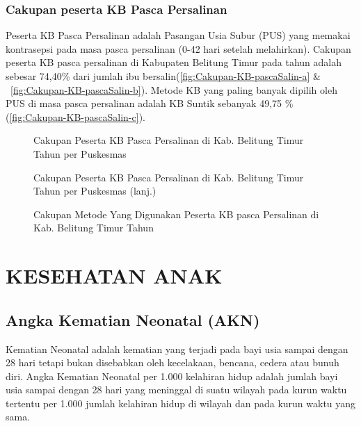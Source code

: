 \subsubsection{Cakupan peserta KB Pasca Persalinan}
Peserta KB Pasca Persalinan adalah Pasangan Usia Subur (PUS) yang memakai kontrasepsi pada masa pasca persalinan (0-42 hari setelah melahirkan). Cakupan peserta KB pasca persalinan di Kabupaten Belitung Timur pada tahun \tP adalah sebesar 74,40\% dari jumlah ibu bersalin(\autoref{fig:Cakupan-KB-pascaSalin-a} \& ~\autoref{fig:Cakupan-KB-pascaSalin-b}). Metode KB yang paling banyak dipilih oleh PUS di masa pasca persalinan adalah KB Suntik sebanyak 49,75 \% (\autoref{fig:Cakupan-KB-pascaSalin-c}).

\begin{figure}[H]
    \centering
    \caption{Cakupan Peserta KB Pasca Persalinan di Kab. Belitung Timur Tahun \tP per Puskesmas}
    \label{fig:Cakupan-KB-pascaSalin-a}
\end{figure}

\begin{figure}[H]
    \centering
    \caption{Cakupan Peserta KB Pasca Persalinan di Kab. Belitung Timur Tahun \tP per Puskesmas (lanj.)}
    \label{fig:Cakupan-KB-pascaSalin-b}
\end{figure}

\begin{figure}[H]
    \centering
    \caption{Cakupan Metode Yang Digunakan Peserta KB pasca Persalinan di Kab. Belitung Timur Tahun \tP}
    \label{fig:Cakupan-KB-pascaSalin-c}
\end{figure}

\section{KESEHATAN ANAK}
\subsection{Angka Kematian Neonatal (AKN)}
Kematian Neonatal adalah kematian yang terjadi pada bayi usia sampai dengan 28 hari tetapi bukan disebabkan oleh kecelakaan, bencana, cedera atau bunuh diri. Angka Kematian Neonatal per 1.000 kelahiran hidup adalah jumlah bayi usia sampai dengan 28 hari yang meninggal di suatu wilayah pada kurun waktu tertentu per 1.000 jumlah kelahiran hidup di wilayah dan pada kurun waktu yang sama.


